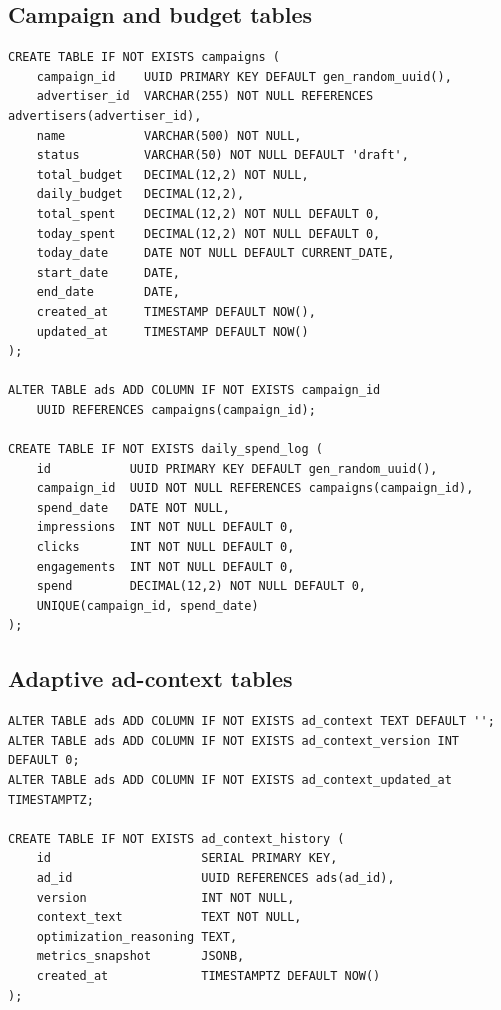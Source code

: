 \begin{appendices}
\subsection*{Campaign and budget tables}

\begin{lstlisting}[style=sqlstyle, caption={Advertiser portal tables.}]
CREATE TABLE IF NOT EXISTS campaigns (
    campaign_id    UUID PRIMARY KEY DEFAULT gen_random_uuid(),
    advertiser_id  VARCHAR(255) NOT NULL REFERENCES advertisers(advertiser_id),
    name           VARCHAR(500) NOT NULL,
    status         VARCHAR(50) NOT NULL DEFAULT 'draft',
    total_budget   DECIMAL(12,2) NOT NULL,
    daily_budget   DECIMAL(12,2),
    total_spent    DECIMAL(12,2) NOT NULL DEFAULT 0,
    today_spent    DECIMAL(12,2) NOT NULL DEFAULT 0,
    today_date     DATE NOT NULL DEFAULT CURRENT_DATE,
    start_date     DATE,
    end_date       DATE,
    created_at     TIMESTAMP DEFAULT NOW(),
    updated_at     TIMESTAMP DEFAULT NOW()
);

ALTER TABLE ads ADD COLUMN IF NOT EXISTS campaign_id
    UUID REFERENCES campaigns(campaign_id);

CREATE TABLE IF NOT EXISTS daily_spend_log (
    id           UUID PRIMARY KEY DEFAULT gen_random_uuid(),
    campaign_id  UUID NOT NULL REFERENCES campaigns(campaign_id),
    spend_date   DATE NOT NULL,
    impressions  INT NOT NULL DEFAULT 0,
    clicks       INT NOT NULL DEFAULT 0,
    engagements  INT NOT NULL DEFAULT 0,
    spend        DECIMAL(12,2) NOT NULL DEFAULT 0,
    UNIQUE(campaign_id, spend_date)
);
\end{lstlisting}

\subsection*{Adaptive ad-context tables}

\begin{lstlisting}[style=sqlstyle, caption={Tables supporting the adaptive
    context-optimisation loop (Section~\ref{subsubsec:adaptive-optimisation}).}]
ALTER TABLE ads ADD COLUMN IF NOT EXISTS ad_context TEXT DEFAULT '';
ALTER TABLE ads ADD COLUMN IF NOT EXISTS ad_context_version INT DEFAULT 0;
ALTER TABLE ads ADD COLUMN IF NOT EXISTS ad_context_updated_at TIMESTAMPTZ;

CREATE TABLE IF NOT EXISTS ad_context_history (
    id                     SERIAL PRIMARY KEY,
    ad_id                  UUID REFERENCES ads(ad_id),
    version                INT NOT NULL,
    context_text           TEXT NOT NULL,
    optimization_reasoning TEXT,
    metrics_snapshot       JSONB,
    created_at             TIMESTAMPTZ DEFAULT NOW()
);
\end{lstlisting}


\end{appendices}
